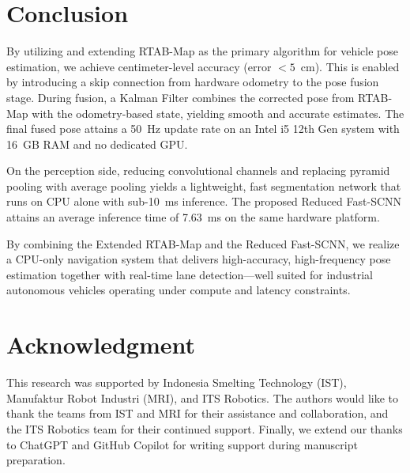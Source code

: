 \documentclass[conference, a4paper]{IEEEtran}
\begin{document}
\section{Conclusion} 
By utilizing and extending RTAB-Map as the primary algorithm for vehicle pose estimation, we achieve centimeter-level accuracy (error $<5$~cm). This is enabled by introducing a skip connection from hardware odometry to the pose fusion stage. During fusion, a Kalman Filter combines the corrected pose from RTAB-Map with the odometry-based state, yielding smooth and accurate estimates. The final fused pose attains a 50~Hz update rate on an Intel i5 12th Gen system with 16~GB RAM and no dedicated GPU.

\par
On the perception side, reducing convolutional channels and replacing pyramid pooling with average pooling yields a lightweight, fast segmentation network that runs on CPU alone with sub-10~ms inference. The proposed Reduced Fast-SCNN attains an average inference time of 7.63~ms on the same hardware platform.

\par
By combining the Extended RTAB-Map and the Reduced Fast-SCNN, we realize a CPU-only navigation system that delivers high-accuracy, high-frequency pose estimation together with real-time lane detection—well suited for industrial autonomous vehicles operating under compute and latency constraints.

\section{Acknowledgment}
This research was supported by Indonesia Smelting Technology (IST), Manufaktur Robot Industri (MRI), and ITS Robotics. The authors would like to thank the teams from IST and MRI for their assistance and collaboration, and the ITS Robotics team for their continued support. Finally, we extend our thanks to ChatGPT and GitHub Copilot for writing support during manuscript preparation.





\end{document}
